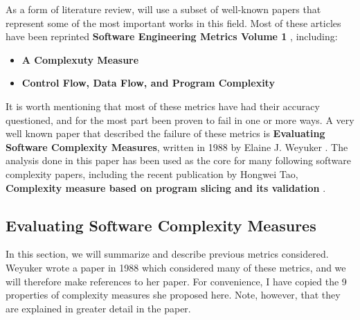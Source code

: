\documentclass[]{article}
\begin{document}
As a form of literature review, will use a subset of well-known papers that represent some of the most important works in this field.
Most of these articles have been reprinted \textbf{Software Engineering Metrics Volume 1} \cite{sheppherd1993complexity}, including:
\begin{itemize}
	\item \textbf{A Complexuty Measure} \cite{ref:a_complexity_measure}
	\item \textbf{Control Flow, Data Flow, and Program Complexity} \cite{ref:oviedo1993control}
\end{itemize}

It is worth mentioning that most of these metrics have had their accuracy questioned, and for the most part been proven to fail in one or more ways.
A very well known paper that described the failure of these metrics is \textbf{Evaluating Software Complexity Measures}, written in 1988 by Elaine J. Weyuker \cite{ref:evaluating_software_complexity_measures}.
The analysis done in this paper has been used as the core for many following software complexity papers, including the recent publication by Hongwei Tao, \textbf{Complexity measure based on program slicing and its validation} \cite{ref:tao2014complexity}.



\subsection{Evaluating Software Complexity Measures}


In this section, we will summarize and describe previous metrics considered.
Weyuker wrote a paper in 1988\cite{ref:evaluating_software_complexity_measures} which considered many of these metrics, and we will therefore make references to her paper.
For convenience, I have copied the 9 properties of complexity measures she proposed here. 
Note, however, that they are explained in greater detail in the paper.
\end{document}
